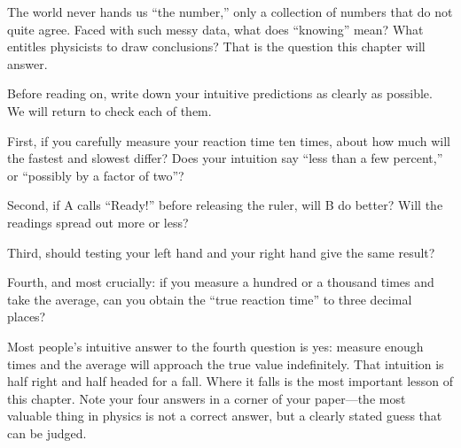 The world never hands us ``the number,'' only a collection of numbers that do not quite agree. Faced with such messy data, what does ``knowing'' mean? What entitles physicists to draw conclusions? That is the question this chapter will answer.


Before reading on, write down your intuitive predictions as clearly as possible. We will return to check each of them.

First, if you carefully measure your reaction time ten times, about how much will the fastest and slowest differ? Does your intuition say ``less than a few percent,'' or ``possibly by a factor of two''?

Second, if A calls ``Ready!'' before releasing the ruler, will B do better? Will the readings spread out more or less?

Third, should testing your left hand and your right hand give the same result?

Fourth, and most crucially: if you measure a hundred or a thousand times and take the average, can you obtain the ``true reaction time'' to three decimal places?

Most people's intuitive answer to the fourth question is yes: measure enough times and the average will approach the true value indefinitely. That intuition is half right and half headed for a fall. Where it falls is the most important lesson of this chapter. Note your four answers in a corner of your paper---the most valuable thing in physics is not a correct answer, but a clearly stated guess that can be judged.


